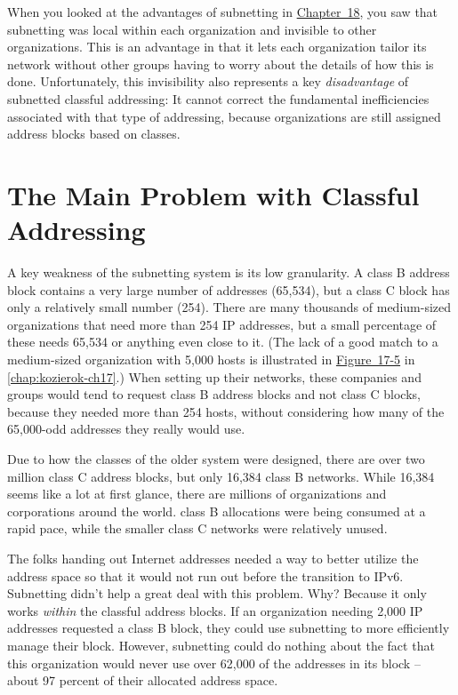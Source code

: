 When you looked at the advantages of subnetting in
\protect\hyperlink{ch18.html}{Chapter~18}, you saw that subnetting was
local within each organization and invisible to other organizations.
This is an advantage in that it lets each organization tailor its
network without other groups having to worry about the details of how
this is done. Unfortunately, this invisibility also represents a key
{\emph{disadvantage}} of subnetted classful addressing: It cannot
correct the fundamental inefficiencies associated with that type of
addressing, because organizations are still assigned address blocks
based on classes.

\section{The Main Problem with Classful Addressing}

A key weakness of the subnetting system is its low
\protect\hypertarget{ch20.htmlux5cux23idx-CHP-20-0759}{}{}granularity. A
class B address block contains a very large number of addresses
(65,534), but a class C block has only a relatively small number (254).
There are many thousands of medium-sized organizations that need more
than 254 IP addresses, but a small percentage of these needs 65,534 or
anything even close to it. (The lack of a good match to a medium-sized
organization with 5,000 hosts is illustrated in
\protect\hyperlink{ch17s07.htmlux5cux23the_main_problem_with_classful_addressin}{Figure~17-5} in \vref{chap:kozierok-ch17}.)
When setting up their
networks, these companies and groups would tend to request class B
address blocks and not class C blocks, because they needed more than 254
hosts, without considering how many of the 65,000-odd addresses they
really would use.

Due to how the classes of the older system were designed, there are over
two million class C address blocks, but only 16,384 class B networks.
While 16,384 seems like a lot at first glance, there are millions of
organizations and corporations around the world. class B allocations
were being consumed at a rapid pace, while the smaller class C networks
were relatively unused.

The folks handing out Internet addresses needed a way to better utilize
the address space so that it would not run out before the transition to
IPv6. Subnetting didn't help a great deal with this problem. Why?
Because it only works {\emph{within}} the classful address blocks. If an
organization needing 2,000 IP addresses requested a class B block, they
could use subnetting to more efficiently manage their block. However,
subnetting could do nothing about the fact that this organization would
never use over 62,000 of the addresses in its block -- about 97 percent
of their allocated address space.

